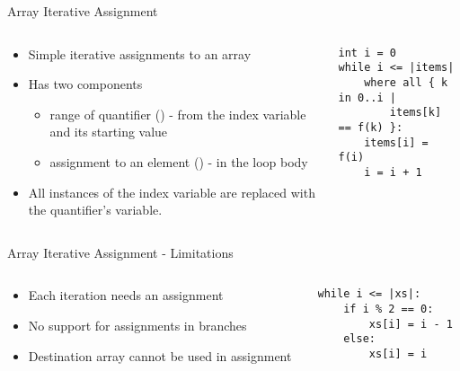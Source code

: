 \begin{frame}[fragile]{Array Iterative Assignment}

\begin{columns}

\begin{column}{0.5\textwidth}

\begin{itemize}
    \item Simple iterative assignments to an array
    \item Has two components
    \begin{itemize}
        \item range of quantifier () - from the index variable and its
            starting value
        \item assignment to an element () - in the loop
            body
    \end{itemize}
    \item All instances of the index variable are replaced with the
        quantifier's variable.
\end{itemize}

\end{column}

\begin{column}{0.5\textwidth}
\begin{verbatim}
int i = 0
while i <= |items|
    where all { k in 0..i |
        items[k] == f(k) }:
    items[i] = f(i)
    i = i + 1
\end{verbatim}
\end{column}

\end{columns}

\end{frame}



\begin{frame}[fragile]{Array Iterative Assignment - Limitations}
\begin{columns}

\begin{column}{0.5\textwidth}
\begin{itemize}
    \item Each iteration needs an assignment
    \item No support for assignments in branches
    \item Destination array cannot be used in assignment
\end{itemize}
\end{column}

\begin{column}{0.5\textwidth}
\begin{verbatim}
while i <= |xs|:
    if i % 2 == 0:
        xs[i] = i - 1
    else:
        xs[i] = i
\end{verbatim}
\end{column}
\end{columns}
\end{frame}

